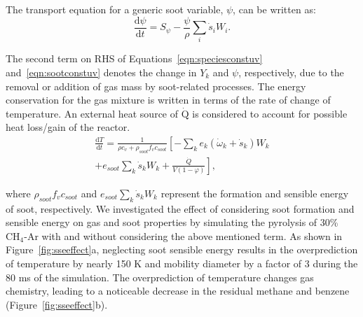The transport equation for a generic soot variable, $\psi$, can be written as:
\begin{equation}
	\frac{\mathrm{d} \psi}{\mathrm{d} t}= S_{\psi} - \frac{\psi}{\rho} \sum_i \dot{s}_i W_i
	\label{eqn:sootconstuv}.
\end{equation}

The second term on RHS of Equations~\eqref{eqn:speciesconstuv} and~\eqref{eqn:sootconstuv} denotes the change in $Y_k$ and $\psi$, respectively, due to the removal or addition of gas mass by soot-related processes.
The energy conservation for the gas mixture is written in terms of the rate of change of temperature. An external heat source of $\mathrm{\dot{Q}}$ is considered to account for possible heat loss/gain of the reactor.
\begin{equation}
	\begin{split}
		\frac{\mathrm{d} T}{\mathrm{d} t}=
		\frac{1}{\rho c_v+\rho_{soot}f_v c_{soot}}
		\left[
		-\sum_k e_k
		\left(
		\dot{\omega}_k+\dot{s}_k
		\right) W_k
		\right. \\
		\left.
		+e_{soot}\sum_k \dot{s}_k W_k
		+\frac{\dot{Q}}{V(1-\varphi)}
		\right],
	\end{split}
	\label{eqn:energyconstuv}
\end{equation}

\noindent where $\rho_{soot}f_v c_{soot}$ and $e_{soot}\sum_k \dot{s}_k W_k$ represent the formation and sensible energy of soot, respectively. We investigated the effect of considering soot formation and sensible energy on gas and soot properties by simulating the pyrolysis of 30\%~$\mathrm{CH_4}$-Ar with and without considering the above mentioned term. As shown in Figure~\ref{fig:sseeffect}a, neglecting soot sensible energy results in the overprediction of temperature by nearly 150 K and mobility diameter by a factor of 3 during the 80 ms of the simulation. The overprediction of temperature changes gas chemistry, leading to a noticeable decrease in the residual methane and benzene (Figure~\ref{fig:sseeffect}b).



